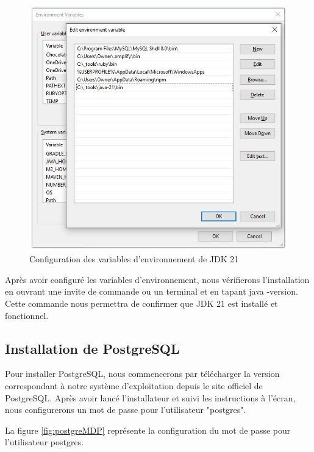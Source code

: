 \documentclass[12pt]{report}
\begin{document}
\begin{figure}[h]
\begin{minipage}[t]{0.48\textwidth}
			        \includegraphics[width=\textwidth]{PATH.jpg}
			    \end{minipage}
			     \caption{Configuration des variables d'environnement de JDK 21}
			     \label{fig:JDKVar}
			\end{figure}
			\FloatBarrier
			
			Après avoir configuré les variables d'environnement, nous vérifierons l'installation en ouvrant une invite de commande ou un terminal et en tapant java -version. Cette commande nous permettra de confirmer que JDK 21 est installé et fonctionnel.

			\subsection{Installation de PostgreSQL}

			\hspace{15pt} Pour installer PostgreSQL, nous commencerons par télécharger la version correspondant à notre système d'exploitation depuis le site officiel de PostgreSQL. Après avoir lancé l'installateur et suivi les instructions à l'écran, nous configurerons un mot de passe pour l'utilisateur "postgres".

			La figure \ref{fig:postgreMDP} représente la  configuration du mot de passe pour l'utilisateur postgres.
			
\end{document}
